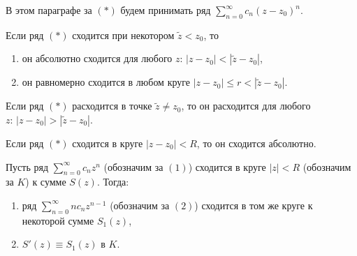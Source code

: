 
В этом параграфе за \((*)\) будем принимать ряд \(\sum\limits_{n=0}^\infty{c_n(z-z_0)^n}\).

\begin{theorem}
    Если ряд \((*)\) сходится при некотором \(\tilde{z} < z_0\), то
    \begin{enumerate}[wide=20pt, label=\arabic*., itemsep=0ex]
        \item он абсолютно сходится для любого \(z \colon \, |z-z_0|<|\tilde{z} - z_0|\),
        \item он равномерно сходится в любом круге \(|z-z_0| \le r < |\tilde{z} - z_0|\).
    \end{enumerate}
\end{theorem}

\begin{corollary}
    Если ряд \((*)\) расходится в точке \(\tilde{z} \ne z_0\), то он расходится для любого \(z
    \colon \, |z-z_0| > |\tilde{z}-z_0|\).
\end{corollary}

\begin{corollary}
    Если ряд \((*)\) сходится в круге \(|z-z_0| < R\), то он сходится абсолютно.
\end{corollary}

\begin{statement}
    Пусть ряд \(\sum\limits_{n=0}^\infty{c_n z^n}\) (обозначим за \((1)\)) сходится в круге \(|z| <
    R\) (обозначим за \(K\)) к сумме \(S(z)\). Тогда:
    \begin{enumerate}[wide=20pt, label=\arabic*., itemsep=0ex]
        \item ряд \(\sum\limits_{n=0}^\infty{n c_n z^{n-1}}\) (обозначим за \((2)\)) сходится в том
        же круге к некоторой сумме \(S_1(z)\),
        \item \(S'(z) \equiv S_1(z)\) в \(K\).
    \end{enumerate}
\end{statement}


